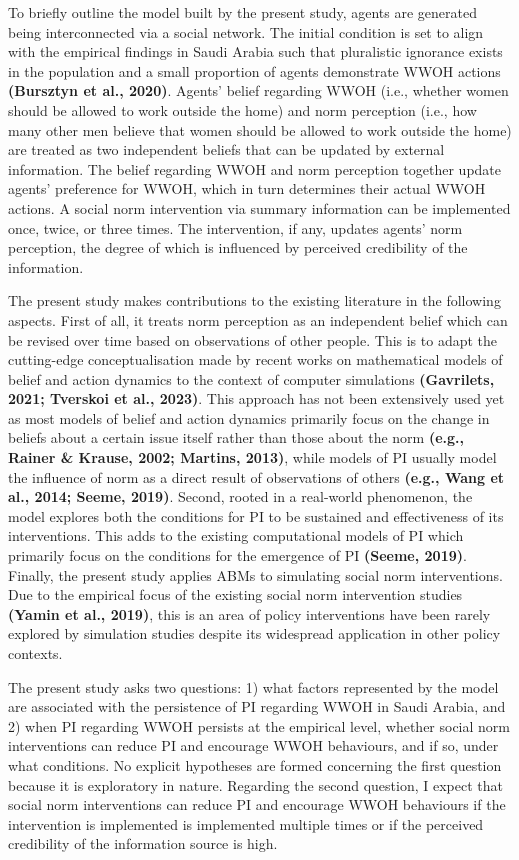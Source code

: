 \documentclass[
  11pt,
]{article}
\begin{document}
To briefly outline the model built by the present study, agents are
generated being interconnected via a social network. The initial
condition is set to align with the empirical findings in Saudi Arabia
such that pluralistic ignorance exists in the population and a small
proportion of agents demonstrate WWOH actions \textbf{(Bursztyn et al.,
2020)}. Agents' belief regarding WWOH (i.e., whether women should be
allowed to work outside the home) and norm perception (i.e., how many
other men believe that women should be allowed to work outside the home)
are treated as two independent beliefs that can be updated by external
information. The belief regarding WWOH and norm perception together
update agents' preference for WWOH, which in turn determines their
actual WWOH actions. A social norm intervention via summary information
can be implemented once, twice, or three times. The intervention, if
any, updates agents' norm perception, the degree of which is influenced
by perceived credibility of the information.

The present study makes contributions to the existing literature in the
following aspects. First of all, it treats norm perception as an
independent belief which can be revised over time based on observations
of other people. This is to adapt the cutting-edge conceptualisation
made by recent works on mathematical models of belief and action
dynamics to the context of computer simulations \textbf{(Gavrilets,
2021; Tverskoi et al., 2023)}. This approach has not been extensively
used yet as most models of belief and action dynamics primarily focus on
the change in beliefs about a certain issue itself rather than those
about the norm \textbf{(e.g., Rainer \& Krause, 2002; Martins, 2013)},
while models of PI usually model the influence of norm as a direct
result of observations of others \textbf{(e.g., Wang et al., 2014;
Seeme, 2019)}. Second, rooted in a real-world phenomenon, the model
explores both the conditions for PI to be sustained and effectiveness of
its interventions. This adds to the existing computational models of PI
which primarily focus on the conditions for the emergence of PI
\textbf{(Seeme, 2019)}. Finally, the present study applies ABMs to
simulating social norm interventions. Due to the empirical focus of the
existing social norm intervention studies \textbf{(Yamin et al., 2019)},
this is an area of policy interventions have been rarely explored by
simulation studies despite its widespread application in other policy
contexts.

The present study asks two questions: 1) what factors represented by the
model are associated with the persistence of PI regarding WWOH in Saudi
Arabia, and 2) when PI regarding WWOH persists at the empirical level,
whether social norm interventions can reduce PI and encourage WWOH
behaviours, and if so, under what conditions. No explicit hypotheses are
formed concerning the first question because it is exploratory in
nature. Regarding the second question, I expect that social norm
interventions can reduce PI and encourage WWOH behaviours if the
intervention is implemented is implemented multiple times or if the
perceived credibility of the information source is high.
\end{document}
